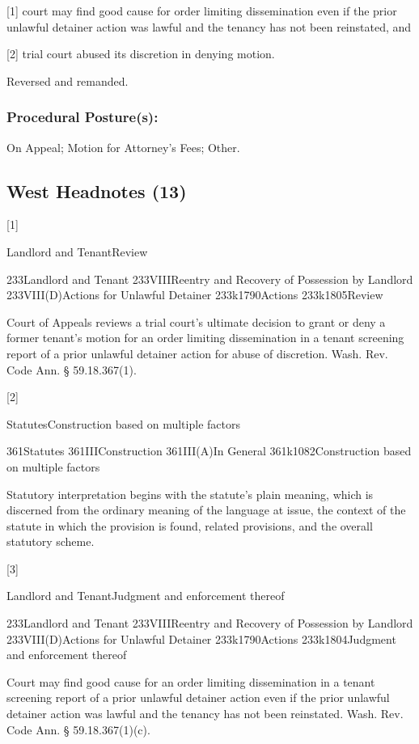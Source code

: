 \documentclass[11pt]{article}
\begin{document}
[1] court may find good cause for order limiting dissemination even if the prior unlawful detainer action was lawful and the tenancy has not been reinstated, and

[2] trial court abused its discretion in denying motion.

Reversed and remanded.

\subsubsection{Procedural Posture(s):}
\label{sec:org60c824b}
On Appeal; Motion for Attorney’s Fees; Other.

\subsection{West Headnotes (13)}
\label{sec:orgf4c9ee8}

[1]

Landlord and TenantReview


233Landlord and Tenant
233VIIIReentry and Recovery of Possession by Landlord
233VIII(D)Actions for Unlawful Detainer
233k1790Actions
233k1805Review


Court of Appeals reviews a trial court’s ultimate decision to grant or deny a former tenant’s motion for an order limiting dissemination in a tenant screening report of a prior unlawful detainer action for abuse of discretion. Wash. Rev. Code Ann. § 59.18.367(1).




[2]

StatutesConstruction based on multiple factors


361Statutes
361IIIConstruction
361III(A)In General
361k1082Construction based on multiple factors


Statutory interpretation begins with the statute’s plain meaning, which is discerned from the ordinary meaning of the language at issue, the context of the statute in which the provision is found, related provisions, and the overall statutory scheme.




[3]

Landlord and TenantJudgment and enforcement thereof


233Landlord and Tenant
233VIIIReentry and Recovery of Possession by Landlord
233VIII(D)Actions for Unlawful Detainer
233k1790Actions
233k1804Judgment and enforcement thereof


Court may find good cause for an order limiting dissemination in a tenant screening report of a prior unlawful detainer action even if the prior unlawful detainer action was lawful and the tenancy has not been reinstated. Wash. Rev. Code Ann. § 59.18.367(1)(c).
\end{document}
